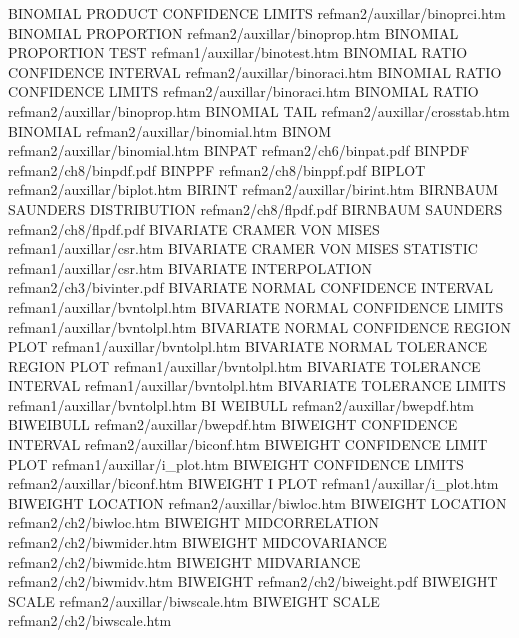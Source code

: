 BINOMIAL PRODUCT CONFIDENCE LIMITS      refman2/auxillar/binoprci.htm
BINOMIAL PROPORTION                     refman2/auxillar/binoprop.htm
BINOMIAL PROPORTION TEST                refman1/auxillar/binotest.htm
BINOMIAL RATIO CONFIDENCE INTERVAL      refman2/auxillar/binoraci.htm
BINOMIAL RATIO CONFIDENCE LIMITS        refman2/auxillar/binoraci.htm
BINOMIAL RATIO                          refman2/auxillar/binoprop.htm
BINOMIAL TAIL                           refman2/auxillar/crosstab.htm
BINOMIAL                                refman2/auxillar/binomial.htm
BINOM                                   refman2/auxillar/binomial.htm
BINPAT                                  refman2/ch6/binpat.pdf
BINPDF                                  refman2/ch8/binpdf.pdf
BINPPF                                  refman2/ch8/binppf.pdf
BIPLOT                                  refman2/auxillar/biplot.htm
BIRINT                                  refman2/auxillar/birint.htm
BIRNBAUM SAUNDERS DISTRIBUTION          refman2/ch8/flpdf.pdf
BIRNBAUM SAUNDERS                       refman2/ch8/flpdf.pdf
BIVARIATE CRAMER VON MISES              refman1/auxillar/csr.htm
BIVARIATE CRAMER VON MISES STATISTIC    refman1/auxillar/csr.htm
BIVARIATE INTERPOLATION                 refman2/ch3/bivinter.pdf
BIVARIATE NORMAL CONFIDENCE INTERVAL    refman1/auxillar/bvntolpl.htm
BIVARIATE NORMAL CONFIDENCE LIMITS      refman1/auxillar/bvntolpl.htm
BIVARIATE NORMAL CONFIDENCE REGION PLOT refman1/auxillar/bvntolpl.htm
BIVARIATE NORMAL TOLERANCE REGION PLOT  refman1/auxillar/bvntolpl.htm
BIVARIATE TOLERANCE INTERVAL            refman1/auxillar/bvntolpl.htm
BIVARIATE TOLERANCE LIMITS              refman1/auxillar/bvntolpl.htm
BI WEIBULL                              refman2/auxillar/bwepdf.htm
BIWEIBULL                               refman2/auxillar/bwepdf.htm
BIWEIGHT CONFIDENCE INTERVAL            refman2/auxillar/biconf.htm
BIWEIGHT CONFIDENCE LIMIT PLOT          refman1/auxillar/i_plot.htm
BIWEIGHT CONFIDENCE LIMITS              refman2/auxillar/biconf.htm
BIWEIGHT I PLOT                         refman1/auxillar/i_plot.htm
BIWEIGHT LOCATION                       refman2/auxillar/biwloc.htm
BIWEIGHT LOCATION                       refman2/ch2/biwloc.htm
BIWEIGHT MIDCORRELATION                 refman2/ch2/biwmidcr.htm
BIWEIGHT MIDCOVARIANCE                  refman2/ch2/biwmidc.htm
BIWEIGHT MIDVARIANCE                    refman2/ch2/biwmidv.htm
BIWEIGHT                                refman2/ch2/biweight.pdf
BIWEIGHT SCALE                          refman2/auxillar/biwscale.htm
BIWEIGHT SCALE                          refman2/ch2/biwscale.htm
